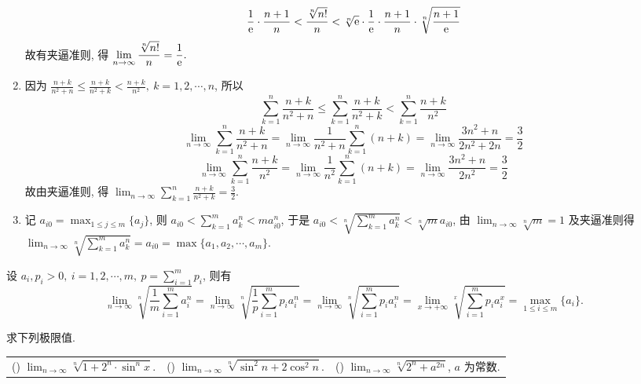 \begin{solution}
\begin{enumerate}[label=(\arabic{*})]
              $$\frac{1}{\mathrm{e} }\cdot\frac{n+1}{n}<\frac{\sqrt[n]{n!}}{n}<\sqrt[n]{\mathrm{e} }\cdot\frac{1}{\mathrm{e} }\cdot\frac{n+1}{n}\cdot\sqrt[n]{\frac{n+1}{\mathrm{e} }}$$
              故有夹逼准则, 得 $\displaystyle\lim_{n\to\infty}\frac{\sqrt[n]{n!}}{n}=\frac{1}{\mathrm{e} }.$
        \item 因为 $\displaystyle\frac{n+k}{n^2+n}\leqslant\frac{n+k}{n^2+k}<\frac{n+k}{n^2},~k=1,2,\cdots,n$, 所以
              $$\sum_{k=1}^{n}\frac{n+k}{n^2+n}\leqslant\sum_{k=1}^{n}\frac{n+k}{n^2+k}<\sum_{k=1}^{n}\frac{n+k}{n^2}$$
              $$\lim_{n\to\infty}\sum_{k=1}^{n}\frac{n+k}{n^2+n}=\lim_{n\to\infty}\frac{1}{n^2+n}\sum_{k=1}^{n}(n+k)=\lim_{n\to\infty}\frac{3n^2+n}{2n^2+2n}=\frac{3}{2}$$
              $$\lim_{n\to\infty}\sum_{k=1}^{n}\frac{n+k}{n^2}=\lim_{n\to\infty}\frac{1}{n^2}\sum_{k=1}^{n}(n+k)=\lim_{n\to\infty}\frac{3n^2+n}{2n^2}=\frac{3}{2}$$
              故由夹逼准则, 得 $\displaystyle\lim_{n\to\infty}\sum_{k=1}^{n}\frac{n+k}{n^2+k}=\frac{3}{2}.$
        \item 记 $\displaystyle a_{i0}=\max_{1\leqslant j\leqslant m}\{a_j\}$, 则 $\displaystyle a_{i0}<\sum_{k=1}^{m}a_k^n<m a_{i0}^n$, 于是 $\displaystyle a_{i0}<\sqrt[n]{\sum_{k=1}^{m}a_k^n}<\sqrt[n]{m}a_{i0}$,
              由 $\displaystyle\lim_{n\to\infty}\sqrt[n]{m}=1$ 及夹逼准则得 $\displaystyle\lim_{n\to\infty}\sqrt[n]{\sum_{k=1}^{m}a_k^n}=a_{i0}=\max\{a_1,a_2,\cdots,a_m\}.$
    \end{enumerate}
\end{solution}
\begin{inference}
    设 $\displaystyle a_i,p_i>0,~i=1,2,\cdots,m,~p=\sum_{i=1}^{m}p_i$, 则有
    $$\displaystyle\lim_{n\to\infty}\sqrt[n]{\frac{1}{m}\sum_{i=1}^{m}a_i^n}=\displaystyle \lim_{n\to\infty}\sqrt[n]{\frac{1}{p}\sum_{i=1}^{m}p_ia_i^n}=\displaystyle \lim_{n\to\infty}\sqrt[n]{\sum_{i=1}^{m}p_ia_i^n}=\displaystyle \lim_{x\to+\infty}\sqrt[x]{\sum_{i=1}^{m}p_ia_i^x}=\max_{1\leqslant i\leqslant m}\{a_i\}.$$
    \label{maxai}
\end{inference}
\begin{example}
    求下列极限值.
    \setcounter{magicrownumbers}{0}
    \begin{table}[H]
        \centering
        \begin{tabular}{l | l | l}
            (\rownumber{}) $\displaystyle\lim_{n\to\infty}\sqrt[n]{1+2^n\cdot\sin^nx}.$ & (\rownumber{}) $\displaystyle\lim_{n\to\infty}\sqrt[n]{\sin^2n+2\cos^2n}.$ & (\rownumber{}) $\displaystyle\lim_{n\to\infty}\sqrt[n]{2^n+a^{2n}}$, $a$ 为常数.
        \end{tabular}
    \end{table}
\end{example}
